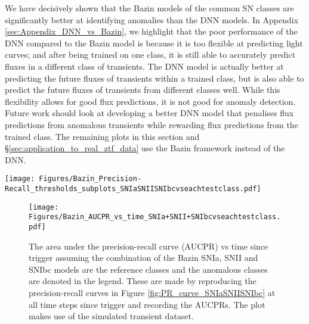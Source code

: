\documentclass[fleqn,usenatbib]{mnras}
\begin{document}
We have decisively shown that the Bazin models of the common SN classes are significantly better at identifying anomalies than the DNN models. In Appendix \ref{sec:Appendix_DNN_vs_Bazin}, we highlight that the poor performance of the DNN compared to the Bazin model is because it is too flexible at predicting light curves; and after being trained on one class, it is still able to accurately predict fluxes in a different class of transients. The DNN model is actually better at predicting the future fluxes of transients within a trained class, but is also able to predict the future fluxes of transients from different classes well. While this flexibility allows for good flux predictions, it is not good for anomaly detection. Future work should look at developing a better DNN model that penalises flux predictions from anomalous transients while rewarding flux predictions from the trained class. The remaining plots in this section and \S\ref{sec:application_to_real_ztf_data} use the Bazin framework instead of the DNN.




\begin{figure*}
    \centering
    \texttt{[image: Figures/Bazin\_Precision-Recall\_thresholds\_subplots\_SNIaSNIISNIbcvseachtestclass.pdf]}
    \caption{The precision and recall curves plotted at different threshold anomaly scores, assuming the combination of the Bazin SNIa, SNII, and SNIbc models are the reference classes and the anomalous classes are denoted in the legend.  The recall and precision are plotted against threshold anomaly scores in the right panels and the precision-recall curve is plotted at different thresholds in the left panel. The area under the precision-recall curves are shown in brackets in the legend.  We use the anomaly scores over the full light curves of all transients in the simulated testing set to make these precision-recall curves.}
    \label{fig:PR_curve_SNIaSNIISNIbc}
\end{figure*}


\begin{figure}
    \centering
    \texttt{[image: Figures/Bazin\_AUCPR\_vs\_time\_SNIa+SNII+SNIbcvseachtestclass.pdf]}
    \caption{The area under the precision-recall curve (AUCPR) vs time since trigger assuming the combination of the Bazin SNIa, SNII and SNIbc models are the reference classes and the anomalous classes are denoted in the legend. These are made by reproducing the precision-recall curves in Figure \ref{fig:PR_curve_SNIaSNIISNIbc} at all time steps since trigger and recording the AUCPRs. The plot makes use of the simulated transient dataset.}
    \label{fig:AUCPR_curve_SNIaSNIISNIbc}
\end{figure}
\end{document}
